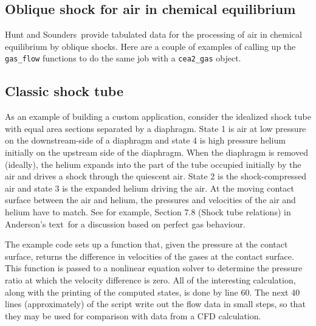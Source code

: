 \documentclass[landscape,12pt,a4paper]{article}
\begin{document}
\bigskip
\subsection{Oblique shock for air in chemical equilibrium}
%
Hunt and Sounders\,\cite{hunt_souders_1975a} provide tabulated data for the processing
of air in chemical equilibrium by oblique shocks.
Here are a couple of examples of calling up the \verb!gas_flow! functions to do the same job
with a \verb!cea2_gas! object.






\subsection{Classic shock tube}
%
As an example of building a custom application, consider the idealized shock tube 
with equal area sections separated by a diaphragm.
State 1 is air at low pressure on the downstream-side of a diaphragm and 
state 4 is high pressure helium initially on the upstream side of the diaphragm.
When the diaphragm is removed (ideally), the helium expands into the part of the tube
occupied initially by the air and drives a shock through the quiescent air.
State 2 is the shock-compressed air and state 3 is the expanded helium
driving the air.
At the moving contact surface between the air and helium, the pressures and velocities
of the air and helium have to match.
See for example, Section 7.8 (Shock tube relations) in Anderson's text\,\cite{anderson_82}
for a discussion based on perfect gas behaviour.

\medskip
The example code sets up a function that, given the pressure at the contact surface,
returns the difference in velocities of the gases at the contact surface.
This function is passed to a nonlinear equation solver to determine the pressure ratio
at which the velocity difference is zero.
All of the interesting calculation, 
along with the printing of the computed states, is done by line 60.
The next 40 lines (approximately) of the script write out the flow data in small steps, 
so that they may be used for comparison with data from a CFD calculation.



\bigskip
\end{document}
